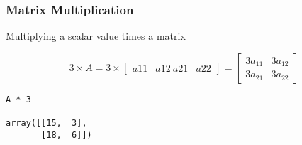  \begin{frame}[fragile] \frametitle{Matrix Multiplication}

Multiplying a scalar value times a matrix

\begin{equation}
3 \times A = 3 \times \begin{bmatrix} a{11} & a{12} \ a{21} & a{22}
\end{bmatrix}
=
\begin{bmatrix}
  3a_{11} & 3a_{12} \\
  3a_{21} & 3a_{22}     
\end{bmatrix}
\end{equation}


\begin{lstlisting}
A * 3

array([[15,  3],
       [18,  6]])
\end{lstlisting}

\end{frame}

